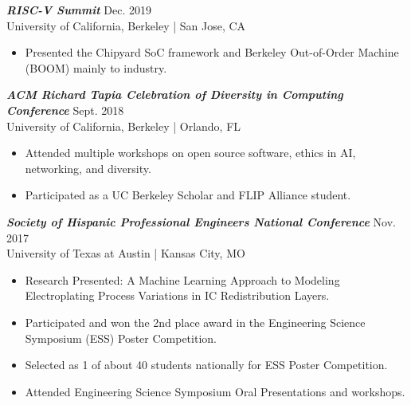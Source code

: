 \documentclass[letter]{res}
\begin{document}
\begin{resume}
\vspace{-2mm}

{\sl \textbf{RISC-V Summit}} \hfill Dec. 2019\\
 University of California, Berkeley | San Jose, CA \newline

 \vspace{-4mm}

 \begin{itemize}
 \item Presented the Chipyard SoC framework and Berkeley Out-of-Order Machine (BOOM) mainly to industry.
 \end{itemize}

\vspace{-2mm}

{\sl \textbf{ACM Richard Tapia Celebration of Diversity in Computing Conference}} \hfill Sept. 2018\\
 University of California, Berkeley | Orlando, FL \newline

 \vspace{-4mm}

 \begin{itemize}
 \item Attended multiple workshops on open source software, ethics in AI, networking, and diversity.
 \item Participated as a UC Berkeley Scholar and FLIP Alliance student.
 \end{itemize}

\vspace{-2mm}

{\sl \textbf{Society of Hispanic Professional Engineers National Conference}} \hfill Nov. 2017\\
 University of Texas at Austin | Kansas City, MO \newline

 \vspace{-4mm}

 \begin{itemize}
 \item Research Presented: A Machine Learning Approach to Modeling Electroplating Process Variations in IC Redistribution Layers.
 \item Participated and won the 2nd place award in the Engineering Science Symposium (ESS) Poster Competition.
 \item Selected as 1 of about 40 students nationally for ESS Poster Competition.
 \item Attended Engineering Science Symposium Oral Presentations and workshops.
 \end{itemize}


\end{resume}
\end{document}
